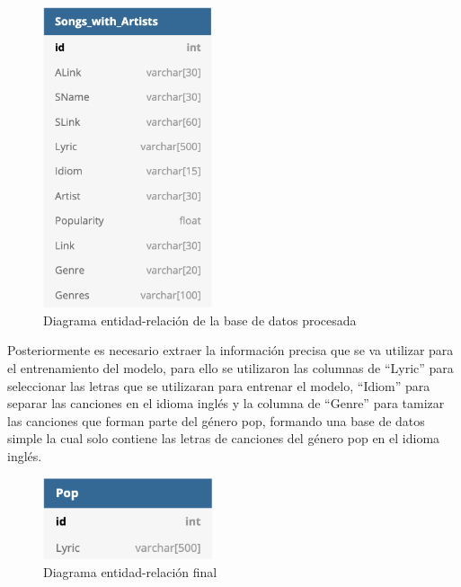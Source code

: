 \documentclass[12pt, a4paper, titlepage]{article}
\begin{document}
	\begin{figure}[H]
		\includegraphics[width=5cm]{./Imagenes/BasedeDatos/Songs_with_Artists.png}
		\centering 
		\caption{Diagrama entidad-relación de la base de datos procesada}
	\end{figure}
	Posteriormente es necesario extraer la información precisa que se va utilizar para el entrenamiento del modelo, para ello se utilizaron las columnas de “Lyric” para seleccionar las letras que se utilizaran para entrenar el modelo, “Idiom” para separar las canciones en el idioma inglés y la columna de “Genre” para tamizar las canciones que forman parte del género pop, formando una base de datos simple la cual solo contiene las letras de canciones del género pop en el idioma inglés.
	\begin{figure}[H]
		\includegraphics[width=5cm]{./Imagenes/BasedeDatos/Pop.png}
		\centering 
		\caption{Diagrama entidad-relación final}
	\end{figure}
	\newpage
\end{document}
